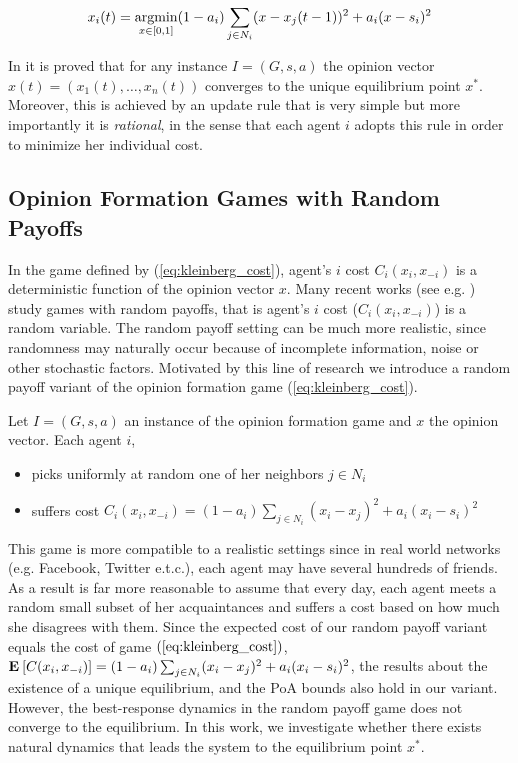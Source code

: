\begin{equation}\label{eq:best_response}
  x_i(t) =
  \operatorname*{argmin}_{x \in [0,1]}
  (1-a_i) \sum_{j \in N_i} (x - x_j(t-1))^2 + a_i (x -s_i)^2
\end{equation}

In \cite{GS14} it is proved that for any instance $I=(G,s,a)$ the opinion
vector $x(t)=(x_1(t),\ldots,x_n(t))$ converges to the unique equilibrium point
$x^*$. Moreover, this is achieved by an update rule that is very simple
but more importantly it is \emph{rational}, in the sense
that each agent $i$ adopts this rule in order to minimize her individual cost.

\subsection{Opinion Formation Games with Random Payoffs}
In the game defined by (\ref{eq:kleinberg_cost}),
agent's $i$ cost $C_i(x_i,x_{-i})$ is a deterministic function of the
opinion vector $x$. Many recent works (see e.g. \cite{Zhou17}) study games
with random payoffs, that is agent's $i$ cost ($C_i(x_i,x_{-i})$) is a
random variable. The random payoff setting can be much more realistic,
since randomness may naturally occur because of incomplete information, noise
or other stochastic factors. Motivated by this
line of research we introduce a random payoff variant of the opinion
formation game (\ref{eq:kleinberg_cost}).

\begin{definition}\label{d:random_payoff_game}
  Let $I=(G,s,a)$ an instance of the opinion formation game
  and $x$ the opinion vector. Each agent $i$,
  \begin{itemize}
    \item picks uniformly at random one of her neighbors $j \in N_i$
    \item suffers cost
      $C_i(x_i,x_{-i}) = (1-a_i)\sum_{j \in N_i}(x_i-x_j)^2 + a_i(x_i-s_i)^2$
  \end{itemize}

\end{definition}

This game is more compatible to a realistic settings since
in real world networks (e.g. Facebook, Twitter e.t.c.), each agent may have
several hundreds of friends. As a result is far more reasonable to assume that
every day, each agent meets a random small subset of her acquaintances and
suffers a cost based on how much she disagrees with them.
Since the expected cost of our random payoff variant equals
the cost of game $(\ref{eq:kleinberg_cost})$, $ \Exp{C(x_i, x_{-i})} =
(1-a_i)\sum_{j \in N_i}(x_i-x_j)^2 + a_i(x_i-s_i)^2$,
the results about the existence of a unique equilibrium,
and the PoA bounds also hold in our variant.
However, the best-response dynamics in the random payoff game
does not converge to the equilibrium.  In this work, we investigate
whether there exists natural dynamics that leads the system to the
equilibrium point $x^*$.

